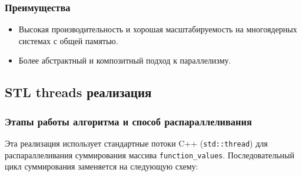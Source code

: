 \documentclass[12pt]{article}
\begin{document}
\subsubsection*{Преимущества}
\begin{itemize}
  \item Высокая производительность и хорошая масштабируемость на многоядерных системах с общей памятью.
  \item Более абстрактный и композитный подход к параллелизму.
\end{itemize}

\subsection{STL threads реализация} \label{sec:stl_threads_impl}
\subsubsection*{Этапы работы алгоритма и способ распараллеливания}
Эта реализация использует стандартные потоки C++ (\texttt{std::thread}) для распараллеливания суммирования массива \texttt{function\_values}. Последовательный цикл суммирования заменяется на следующую схему:
\end{document}
